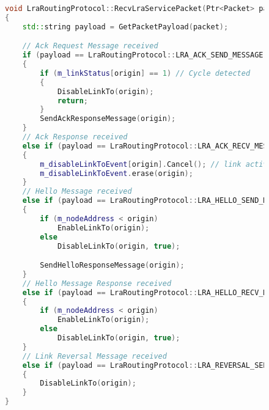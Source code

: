 \documentclass[../report.tex]{subfiles}
\begin{document}
\begin{figure}[H] %
\begin{lstlisting}[language=C++, caption={Service Packet Received Handling Method},captionpos=b]
void LraRoutingProtocol::RecvLraServicePacket(Ptr<Packet> packet, Ipv4Address origin)
{
    std::string payload = GetPacketPayload(packet);

    // Ack Request Message received
    if (payload == LraRoutingProtocol::LRA_ACK_SEND_MESSAGE)
    {
        if (m_linkStatus[origin] == 1) // Cycle detected
        {
            DisableLinkTo(origin);
            return;
        }
        SendAckResponseMessage(origin);
    }
    // Ack Response received
    else if (payload == LraRoutingProtocol::LRA_ACK_RECV_MESSAGE)
    {
        m_disableLinkToEvent[origin].Cancel(); // link active, avoid disabling it
        m_disableLinkToEvent.erase(origin);
    }
    // Hello Message received
    else if (payload == LraRoutingProtocol::LRA_HELLO_SEND_MESSAGE)
    {
        if (m_nodeAddress < origin)
            EnableLinkTo(origin);
        else
            DisableLinkTo(origin, true);

        SendHelloResponseMessage(origin);
    }
    // Hello Message Response received
    else if (payload == LraRoutingProtocol::LRA_HELLO_RECV_MESSAGE)
    {
        if (m_nodeAddress < origin)
            EnableLinkTo(origin);
        else
            DisableLinkTo(origin, true);
    }
    // Link Reversal Message received
    else if (payload == LraRoutingProtocol::LRA_REVERSAL_SEND_MESSAGE)
    {
        DisableLinkTo(origin);
    }
}
\end{lstlisting}
\end{figure}
\end{document}
